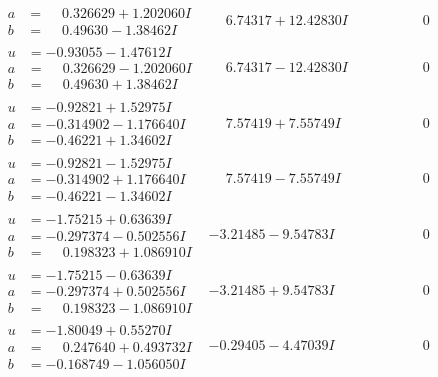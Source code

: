 \documentclass[1p]{elsarticle_modified}
\theoremstyle{definition}
\begin{document}
$$\begin{array}{c|c|c}
\begin{aligned}
a &= \phantom{-}0.326629 + 1.202060 I \\
b &= \phantom{-}0.49630 - 1.38462 I\end{aligned}
 & \phantom{-}6.74317 + 12.42830 I & \phantom{-0.000000 } 0 \\ \hline\begin{aligned}
u &= -0.93055 - 1.47612 I \\
a &= \phantom{-}0.326629 - 1.202060 I \\
b &= \phantom{-}0.49630 + 1.38462 I\end{aligned}
 & \phantom{-}6.74317 - 12.42830 I & \phantom{-0.000000 } 0 \\ \hline\begin{aligned}
u &= -0.92821 + 1.52975 I \\
a &= -0.314902 - 1.176640 I \\
b &= -0.46221 + 1.34602 I\end{aligned}
 & \phantom{-}7.57419 + 7.55749 I & \phantom{-0.000000 } 0 \\ \hline\begin{aligned}
u &= -0.92821 - 1.52975 I \\
a &= -0.314902 + 1.176640 I \\
b &= -0.46221 - 1.34602 I\end{aligned}
 & \phantom{-}7.57419 - 7.55749 I & \phantom{-0.000000 } 0 \\ \hline\begin{aligned}
u &= -1.75215 + 0.63639 I \\
a &= -0.297374 - 0.502556 I \\
b &= \phantom{-}0.198323 + 1.086910 I\end{aligned}
 & -3.21485 - 9.54783 I & \phantom{-0.000000 } 0 \\ \hline\begin{aligned}
u &= -1.75215 - 0.63639 I \\
a &= -0.297374 + 0.502556 I \\
b &= \phantom{-}0.198323 - 1.086910 I\end{aligned}
 & -3.21485 + 9.54783 I & \phantom{-0.000000 } 0 \\ \hline\begin{aligned}
u &= -1.80049 + 0.55270 I \\
a &= \phantom{-}0.247640 + 0.493732 I \\
b &= -0.168749 - 1.056050 I\end{aligned}
 & -0.29405 - 4.47039 I & \phantom{-0.000000 } 0 \\ \hline\begin{aligned}

\end{aligned}
\end{array}$$
\end{document}
